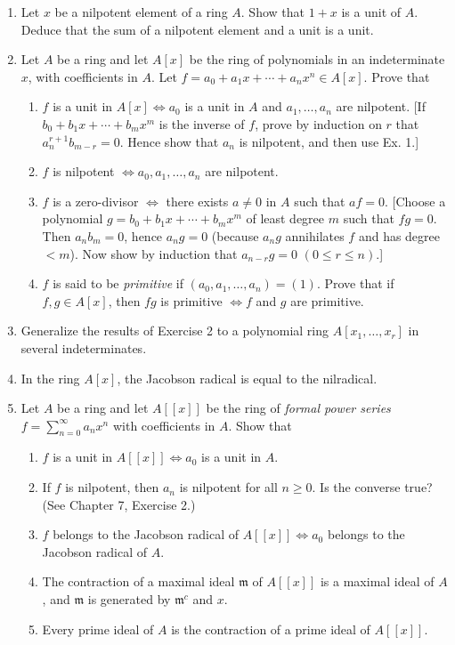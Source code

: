 \begin{enumerate}
\item Let $x$ be a nilpotent element of a ring $A$. Show that $1+x$ is a unit of $A$. Deduce that the sum of a nilpotent element and a unit is a unit.

\item Let $A$ be a ring and let $A[x]$ be the ring of polynomials in an indeterminate $x$, with coefficients in $A$. Let $f=a_0+a_1x+\cdots+a_nx^n\in A[x]$. Prove that
\begin{enumerate}
\renewcommand{\labelenumii}{\roman{enumii})}
\item $f$ is a unit in $A[x]\Longleftrightarrow a_0$ is a unit in $A$ and $a_1,\ldots,a_n$ are nilpotent. [If $b_0+b_1x+\cdots+b_mx^m$ is the inverse of $f$, prove by induction on $r$ that $a_n^{r+1}b_{m-r}=0$. Hence show that $a_n$ is nilpotent, and then use Ex. 1.]
\item $f$ is nilpotent $\Longleftrightarrow a_0,a_1,\ldots,a_n$ are nilpotent.
\item $f$ is a zero-divisor $\Longleftrightarrow$ there exists $a\neq0$ in $A$ such that $af=0$. [Choose a polynomial $g=b_0+b_1x+\cdots+b_mx^m$ of least degree $m$ such that $fg=0$. Then $a_nb_m=0$, hence $a_ng=0$ (because $a_ng$ annihilates $f$ and has degree $<m$). Now show by induction that $a_{n-r}g=0$ $(0\leq r\leq n)$.]
\item $f$ is said to be \textit{primitive} if $(a_0,a_1,\ldots,a_n)=(1)$. Prove that if $f,g\in A[x]$, then $fg$ is primitive $\Longleftrightarrow f$ and $g$ are primitive.
\end{enumerate}

\item Generalize the results of Exercise 2 to a polynomial ring $A[x_1,\ldots,x_r]$ in several indeterminates.

\item In the ring $A[x]$, the Jacobson radical is equal to the nilradical.

\item Let $A$ be a ring and let $A[[x]]$ be the ring of \textit{formal power series} $f=\sum_{n=0}^\infty a_nx^n$ with coefficients in $A$. Show that
\begin{enumerate}
\renewcommand{\labelenumii}{\roman{enumii})}
\item $f$ is a unit in $A[[x]]\Longleftrightarrow a_0$ is a unit in $A$.
\item If $f$ is nilpotent, then $a_n$ is nilpotent for all $n\geq0$. Is the converse true? (See Chapter 7, Exercise 2.)
\item $f$ belongs to the Jacobson radical of $A[[x]]\Longleftrightarrow a_0$ belongs to the Jacobson radical of $A$.
\item The contraction of a maximal ideal $\mathfrak m$ of $A[[x]]$ is a maximal ideal of $A$, and $\mathfrak m$ is generated by $\mathfrak m^c$ and $x$.
\item Every prime ideal of $A$ is the contraction of a prime ideal of $A[[x]]$.
\end{enumerate}


\end{enumerate}
